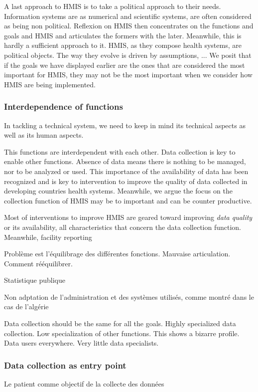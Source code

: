\documentclass[a4paper,11pt,final,twoside]{article}
\begin{document}
A last approach to HMIS is to take a political approach to their needs. Information systems are as numerical and scientific systems, are often considered as being non political. Reflexion on HMIS then concentrates on the functions and goals and HMIS and articulates the formers with the later. Meanwhile, this is hardly a sufficient approach to it. HMIS, as they compose health systems, are political objects. The way they evolve is driven by assumptions, ... We posit that if the goals we have displayed earlier are the ones that are considered the most important for HMIS, they may not be the most important when we consider how HMIS are being implemented.

\subsubsection{Interdependence of functions}

In tackling a technical system, we need to keep in mind its technical aspects as well as its human aspects.

This functions are interdependent with each other. Data collection is key to enable other functions. Absence of data means there is nothing to be managed, nor to be analyzed or used. This importance of the availability of data has been recognized and is key to intervention to improve the quality of data collected in developing countries health systems. Meanwhile, we argue the focus on the collection function of HMIS may be to important and can be counter productive.

Most of interventions to improve HMIS are geared toward improving \textit{data quality} or its availability, all characteristics that concern the data collection function. Meanwhile, facility reporting 

Problème est l'équilibrage des différentes fonctions. Mauvaise articulation. Comment rééquilibrer.

Statistique publique

Non adptation de l'administration et des systèmes utilisés, comme montré dans le cas de l'algérie

Data collection should be the same for all the goals. Highly specialized data collection. Low specialization of other functions. This shows a bizarre profile. Data users everywhere. Very little data specialists.


\subsubsection{Data collection as entry point}
Le patient comme objectif de la collecte des données
\end{document}
